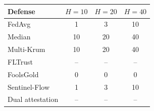 \begin{tabular}{@{}lccc@{}}
\toprule
Defense & $H = 10$ & $H = 20$ & $H = 40$ \\
\midrule
FedAvg & 1 & 3 & 10 \\
Median & 10 & 20 & 40 \\
Multi-Krum & 10 & 20 & 40 \\
FLTrust & -- & -- & -- \\
FoolsGold & 0 & 0 & 0 \\
Sentinel-Flow & 1 & 3 & 10 \\
Dual attestation & -- & -- & -- \\
\bottomrule
\end{tabular}
